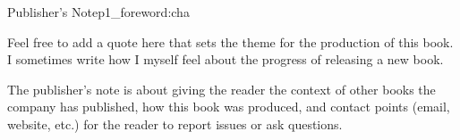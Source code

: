 
\begin{chapterpage}{Publisher's Note}{p1_foreword:cha}

\begin{myquotation}
Feel free to add a quote here that sets the theme for the production of this book. I sometimes write how I myself feel about the progress of releasing a new book.\end{myquotation}

\end{chapterpage}

The publisher's note is about giving the reader the context of other books the company has published, how this book was produced, and contact points (email, website, etc.) for the reader to report issues or ask questions.

\hfil{}\hfil
